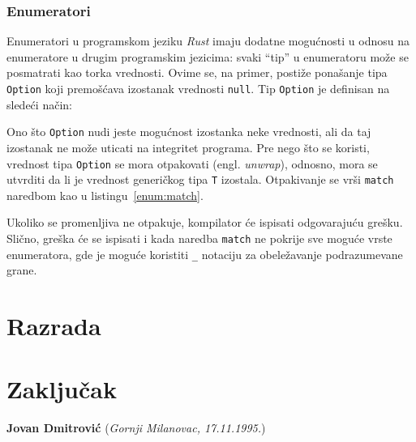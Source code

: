 \documentclass[12pt,oneside]{memoir}
\begin{document}
\subsection{Enumeratori}
Enumeratori u programskom jeziku \emph{Rust} imaju dodatne mogućnosti u odnosu na enumeratore u
drugim programskim jezicima: svaki ``tip'' u enumeratoru može se posmatrati kao torka vrednosti.
Ovime se, na primer, postiže ponašanje tipa \texttt{Option} koji premošćava izostanak vrednosti
\texttt{null}. Tip \texttt{Option} je definisan na sledeći način:



Ono što \texttt{Option} nudi jeste mogućnost izostanka neke vrednosti, ali da taj izostanak ne
može uticati na integritet programa. Pre nego što se koristi, vrednost tipa \texttt{Option}
se mora otpakovati (engl. \emph{unwrap}), odnosno, mora se utvrditi da li je vrednost generičkog
tipa \texttt{T} izostala. Otpakivanje se vrši \texttt{match} naredbom kao u
listingu~\ref{enum:match}.



Ukoliko se promenljiva ne otpakuje, kompilator će ispisati odgovarajuću grešku. Slično, greška će
se ispisati i kada naredba \texttt{match} ne pokrije sve moguće vrste enumeratora, gde je moguće
koristiti \texttt{\_} notaciju za obeležavanje podrazumevane grane.

\chapter{Razrada}
\label{chp:razrada}

\chapter{Zaključak}

\literatura

\backmatter

\begin{biografija}
  \textbf{Jovan Dmitrović} (\emph{Gornji Milanovac, 17.11.1995.}) 
\end{biografija}
\end{document}
